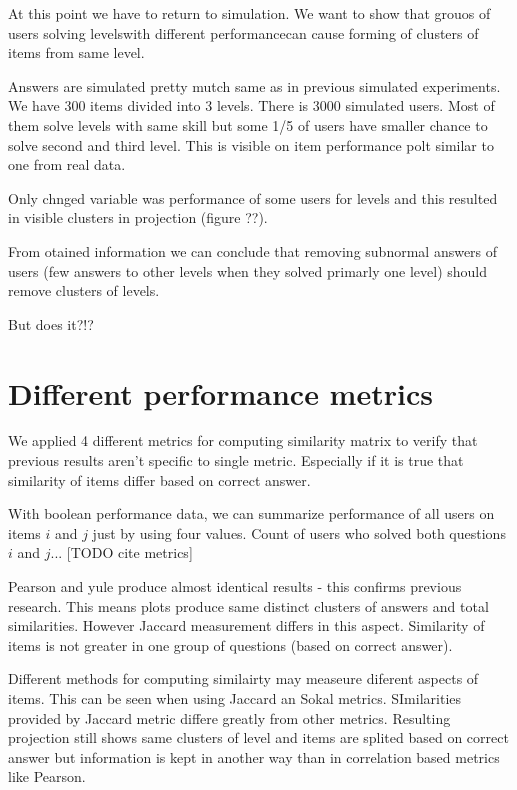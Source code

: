\documentclass[
  digital, %
  table,   %
  nolof,     %
  nolot,     %
  nocover
]{fithesis3}
\begin{document}
At this point we have to return to simulation. We want to show that
grouos of users solving levelswith different performancecan cause
forming of clusters of items from same level.

Answers are simulated pretty mutch same as in previous simulated
experiments. We have 300 items divided into 3 levels. There is 3000
simulated users. Most of them solve levels with same skill but some 1/5
of users have smaller chance to solve second and third level. This is
visible on item performance polt similar to one from real data.

Only chnged variable was performance of some users for levels and this
resulted in visible clusters in projection (figure ??).

From otained information we can conclude that removing subnormal answers
of users (few answers to other levels when they solved primarly one
level) should remove clusters of levels.

But does it?!?

\section{Different performance
metrics}\label{different-performance-metrics}


We applied 4 different metrics for computing similarity matrix to verify
that previous results aren't specific to single metric. Especially if it
is true that similarity of items differ based on correct answer.


With boolean performance data, we can summarize performance of all users on items $i$ and $j$ just by using four values. Count of users who solved both questions $i$ and $j$... [TODO cite metrics]

Pearson and yule produce almost identical results - this confirms
previous research. This means plots produce same distinct clusters of
answers and total similarities. However Jaccard measurement differs in
this aspect. Similarity of items is not greater in one group of
questions (based on correct answer).

Different methods for computing similairty may measeure diferent aspects
of items. This can be seen when using Jaccard an Sokal metrics.
SImilarities provided by Jaccard metric differe greatly from other
metrics. Resulting projection still shows same clusters of level and
items are splited based on correct answer but information is kept in
another way than in correlation based metrics like Pearson.
\end{document}
